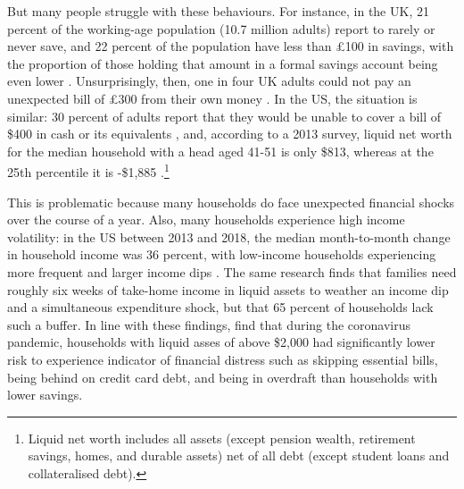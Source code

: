 But many people struggle with these behaviours. For instance, in the UK, 21
percent of the working-age population (10.7 million adults) report to rarely or
never save, and 22 percent of the population have less than \pounds100 in
savings, with the proportion of those holding that amount in a formal savings account being even
lower \citep{mps2018building}. Unsurprisingly, then, one in four UK adults could
not pay an unexpected bill of \pounds300 from their own money
\citep{phillips2021supporting}. In the US, the situation is similar: 30 percent
of adults report that they would be unable to cover a bill of \$400 in cash or
its equivalents \citep{fed2022economic}, and, according to a 2013 survey,
liquid net worth for the median household with a head aged 41-51 is only \$813,
whereas at the 25th percentile it is -\$1,885
\citep{beshears2018behavioral}.\footnote{Liquid net worth includes all assets
    (except pension wealth, retirement savings, homes, and durable assets) net
of all debt (except student loans and collateralised debt).}

This is problematic because many households do face unexpected financial shocks
over the course of a year. Also, many households experience high income
volatility: in the US between 2013 and 2018, the median month-to-month change
in household income was 36 percent, with low-income households experiencing
more frequent and larger income dips \citep{jpmorgan2019weathering}. The same
research finds that families need roughly six weeks of take-home income
in liquid assets to weather an income dip and a simultaneous expenditure shock, but that 65
percent of households lack such a buffer. In line with these findings,
\citet{roll2020income} find that during the coronavirus pandemic, households
with liquid asses of above \$2,000 had significantly lower risk to experience indicator of financial distress such as skipping essential bills, being behind on
credit card debt, and being in overdraft than households with lower savings.

